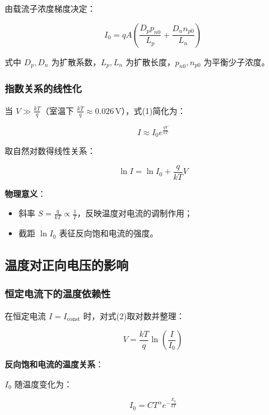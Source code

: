 \documentclass[12pt,a4paper]{article}
\begin{document}
由载流子浓度梯度决定：

\begin{equation}
I_0 = q A \left( \frac{D_p p_{n0}}{L_p} + \frac{D_n n_{p0}}{L_n} \right)
\end{equation}

式中 $D_p, D_n$ 为扩散系数，$L_p, L_n$ 为扩散长度，$p_{n0}, n_{p0}$ 为平衡少子浓度。

\subsubsection{指数关系的线性化}

当 $V \gg \frac{kT}{q}$（室温下 $\frac{kT}{q} \approx 0.026 \, \text{V}$），式(1)简化为：

\begin{equation}
I \approx I_0 e^{\frac{qV}{kT}} \tag{2}
\end{equation}

取自然对数得线性关系：

\begin{equation}
\ln I = \ln I_0 + \frac{q}{kT} V \tag{3}
\end{equation}

\textbf{物理意义}：
\begin{itemize}
\item 斜率 $S = \frac{q}{kT} \propto \frac{1}{T}$，反映温度对电流的调制作用；
\item 截距 $\ln I_0$ 表征反向饱和电流的强度。
\end{itemize}

\subsection{温度对正向电压的影响}

\subsubsection{恒定电流下的温度依赖性}

在恒定电流 $I = I_{\text{const}}$ 时，对式(2)取对数并整理：

\begin{equation}
V = \frac{kT}{q} \ln \left( \frac{I}{I_0} \right) \tag{4}
\end{equation}

\textbf{反向饱和电流的温度关系}：

$I_0$ 随温度变化为：

\begin{equation}
I_0 = C T^{\alpha} e^{-\frac{E_g}{kT}} \tag{5}
\end{equation}
\end{document}
